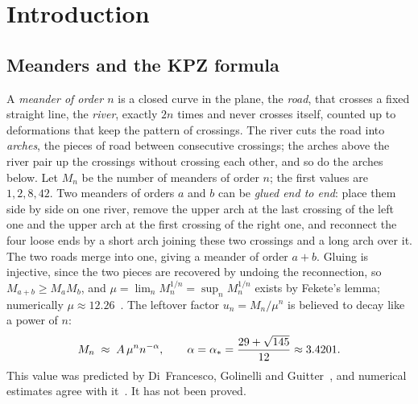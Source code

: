 \section{Introduction}\label{sec:intro}

\subsection{Meanders and the KPZ formula}

A \emph{meander of order $n$} is a closed curve in the plane, the \emph{road}, that crosses a
fixed straight line, the \emph{river}, exactly $2n$ times and never crosses itself, counted up to
deformations that keep the pattern of crossings. The river cuts the road into \emph{arches}, the
pieces of road between consecutive crossings; the arches above the river pair up the crossings
without crossing each other, and so do the arches below. Let $M_n$ be the number of meanders of
order $n$; the first values are $1,2,8,42$. Two meanders of orders $a$ and $b$ can be \emph{glued
end to end}: place them side by side on one river, remove the upper arch at the last crossing of
the left one and the upper arch at the first crossing of the right one, and reconnect the four
loose ends by a short arch joining these two crossings and a long arch over it. The two roads merge
into one, giving a meander of order $a+b$. Gluing is injective, since the two pieces are recovered
by undoing the reconnection, so $M_{a+b}\ge M_aM_b$, and $\mu=\lim_n M_n^{1/n}=\sup_nM_n^{1/n}$ exists by Fekete's lemma;
numerically $\mu\approx12.26$~\cite{JG}. The leftover factor $u_n=M_n/\mu^n$ is believed
to decay like a power of $n$:
\begin{equation}\label{eq:conj}
M_n\;\approx\;A\,\mu^n n^{-\alpha},\qquad \alpha=\alpha_*=\frac{29+\sqrt{145}}{12}\approx3.4201 .
\end{equation}
This value was predicted by Di~Francesco, Golinelli and Guitter~\cite{DGG}, and numerical
estimates agree with it~\cite{JG}. It has not been proved.


